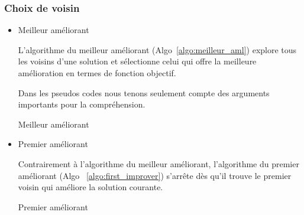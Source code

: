 \subsubsection{Choix de voisin}
\begin{itemize}
	\item Meilleur améliorant
	
	L'algorithme du meilleur améliorant (Algo~\ref{algo:meilleur_aml}) explore tous les voisins d'une solution et sélectionne celui qui offre la meilleure amélioration en termes de fonction objectif.
	
	Dans les pseudos codes nous tenons seulement compte des arguments importants pour la compréhension.
	
	\begin{algorithm}[H]
		\caption{Meilleur améliorant}
		\label{algo:meilleur_aml}
		\begin{algorithmic}[1]
			\Statex
			

			\EndIf
			\EndFor
			\State {}
			\EndFunction
			
		\end{algorithmic}
	\end{algorithm}
	
	\item Premier améliorant
	
	Contrairement à l'algorithme du meilleur améliorant, l'algorithme du premier améliorant (Algo ~\ref{algo:first_improver}) s'arrête dès qu'il trouve le premier voisin qui améliore la solution courante.
	
		\begin{algorithm}[H]
		\caption{Premier améliorant}
		\label{algo:first_improver}
		\begin{algorithmic}[1]
			\Statex
			
			

\end{algorithmic}
\end{algorithm}
\end{itemize}
